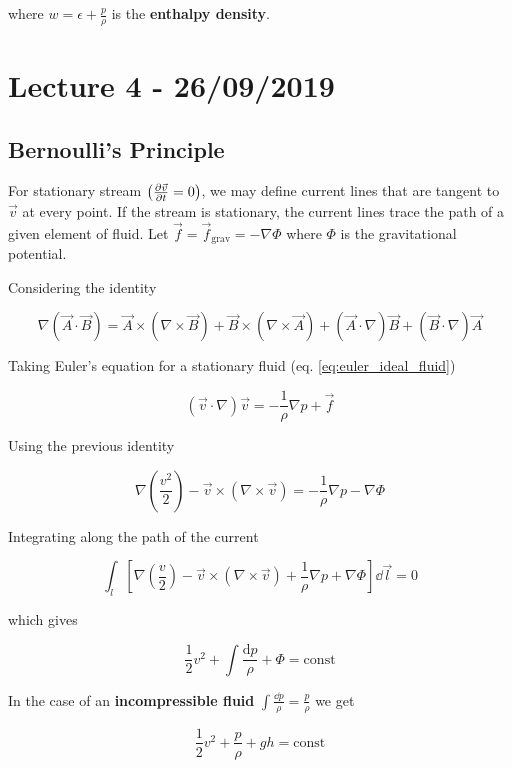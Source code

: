 \documentclass{article}
\begin{document}
where $w = \epsilon + \frac{p}{\rho}$ is the \textbf{enthalpy density}.


\section{Lecture 4 - 26/09/2019}

\subsection{Bernoulli's Principle}

For stationary stream $\left( \pdv{\vec{v}}{t} = 0 \right)$, we may define
current lines that are tangent to $\vec{v}$ at every point. If the stream is
stationary, the current lines trace the path of a given element of fluid. Let
$\vec{f} = \vec{f}_{\text{grav}} = - \nabla \Phi$ where $\Phi$ is the
gravitational potential.

Considering the identity

\begin{equation*}
  \nabla(\vec{A} \cdot \vec{B})=\vec{A} \times(\nabla \times \vec{B}) +  \vec{B} \times(\nabla \times \vec{A})+(\vec{A} \cdot \nabla) \vec{B}+(\vec{B} \cdot \nabla) \vec{A}
\end{equation*}

Taking Euler's equation for a stationary fluid (eq. \ref{eq:euler_ideal_fluid})

\begin{equation*}
  (\vec{v} \cdot \nabla) \vec{v}=-\frac{1}{\rho} \nabla p+\vec{f} 
\end{equation*}

Using the previous identity

\begin{equation*}
  \nabla\left(\frac{v^2}{2}\right)-\vec{v} \times(\nabla \times \vec{v})=-\frac{1}{\rho} \nabla p-\nabla \Phi
\end{equation*}

Integrating along the path of the current

\begin{equation*}
  \int_{l}\left[\nabla\left(\frac{v}{2}\right)-\vec{v} \times(\nabla \times \vec{v})+\frac{1}{\rho} \nabla p+\nabla \Phi\right] \dd{\vec{l}}  =0
\end{equation*}

which gives

\begin{equation}
  \label{eq:bernoulli_general}
  \frac{1}{2} v^{2}+\int \frac{\mathrm{d} p}{\rho}+\Phi=\mathrm{const}
\end{equation}

In the case of an \textbf{incompressible fluid} $\int \frac{\dd{p}}{\rho} =
\frac{p}{\rho}$ we get

\begin{equation}
  \label{eq:bernoulli_incompressible}
  \frac{1}{2} v^{2}+\frac{p}{\rho}+g h=\mathrm{const}
\end{equation}
\end{document}
